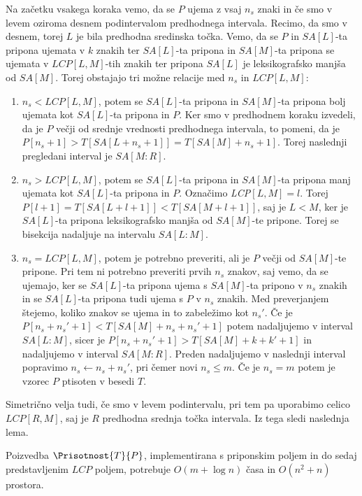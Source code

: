 Na začetku vsakega koraka vemo, da se $P$ ujema z vsaj $n_s$ znaki in če smo v levem oziroma desnem podintervalom predhodnega intervala. Recimo, da smo v desnem, torej $L$ je bila predhodna sredinska točka. Vemo, da se $P$ in $SA[L]$-ta pripona ujemata v $k$ znakih ter $SA[L]$-ta pripona in $SA[M]$-ta pripona se ujemata v $LCP[L,M]$-tih znakih ter pripona $SA[L]$ je leksikografsko manjša od $SA[M]$. Torej obstajajo tri možne relacije med $n_s$ in $LCP[L,M]$:
\begin{enumerate}
    \item $n_s<LCP[L,M]$, potem se $SA[L]$-ta pripona in $SA[M]$-ta pripona bolj ujemata kot $SA[L]$-ta pripona in $P$. Ker smo v predhodnem koraku izvedeli, da je $P$ večji od srednje vrednosti predhodnega intervala, to pomeni, da je $P[n_s+1]>T[SA[L+n_s+1]]=T[SA[M]+n_s+1]$. Torej naslednji pregledani interval je $SA[M:R]$.
    \item $n_s>LCP[L,M]$, potem se $SA[L]$-ta pripona in $SA[M]$-ta pripona manj ujemata kot $SA[L]$-ta pripona in $P$. Označimo \textit{LCP}$[L,M]=l$. Torej $P[l+1]=T[SA[L+l+1]]<T[SA[M+l+1]]$, saj je $L<M$, ker je $SA[L]$-ta pripona leksikografsko manjša od $SA[M]$-te pripone. Torej se bisekcija nadaljuje na intervalu $SA[L:M]$.
    \item $n_s=LCP[L,M]$, potem je potrebno preveriti, ali je $P$ večji od $SA[M]$-te pripone. Pri tem ni potrebno preveriti prvih $n_s$ znakov, saj vemo, da se ujemajo, ker se $SA[L]$-ta pripona ujema s $SA[M]$-ta pripono v $n_s$ znakih in se $SA[L]$-ta pripona tudi ujema s $P$ v $n_s$ znakih. Med preverjanjem štejemo, koliko znakov se ujema in to zabeležimo kot $n_s'$. Če je $P[n_s+n_s'+1]<T[SA[M]+n_s+n_s'+1]$ potem nadaljujemo v interval $SA[L:M]$, sicer je $P[n_s+n_s'+1]>T[SA[M]+k+k'+1]$ in nadaljujemo v interval $SA[M:R]$. Preden nadaljujemo v naslednji interval popravimo $n_s\leftarrow n_s+n_s'$, pri čemer novi $n_s\le m$. Če je $n_s=m$ potem je vzorec $P$ ptisoten v besedi $T$.
\end{enumerate}
Simetrično velja tudi, če smo v levem podintervalu, pri tem pa uporabimo celico $LCP[R,M]$, saj je $R$ predhodna srednja točka intervala. Iz tega sledi naslednja lema.


\begin{lema}\label{lema:LCPKvadrat}
    Poizvedba $\Prisotnost{T}{P}$, implementirana s priponskim poljem in do sedaj predstavljenim $LCP$ poljem, potrebuje $O(m+\log{n})$ časa in $O(n^2 +n)$ prostora.
\end{lema}


